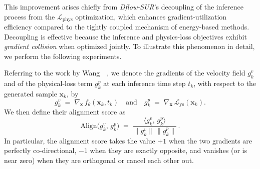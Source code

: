 This improvement arises chiefly from \textit{Dflow-SUR}’s decoupling of the inference process from the $\mathcal{L}_{\mathrm{phys}}$ optimization, which enhances gradient‐utilization efficiency compared to the tightly coupled mechanism of energy-based methods. Decoupling is effective because the inference and physics-loss objectives exhibit \textit{gradient collision} when optimized jointly. To illustrate this phenomenon in detail, we perform the following experiments. 






Referring to the work by Wang~\etal~\cite{aa.Wang2025}, we denote the gradients of the velocity field $g^v_k$ and of the physical‐loss term $g^p_k$ at each inference time step $t_k$, with respect to the generated sample $\mathbf{x}_k$, by
\begin{equation}
    g^v_k \;=\;\nabla_{\mathbf{x}}\,f_\theta(\mathbf{x}_k,t_k)
    \quad\text{and}\quad
    g^p_k \;=\;\nabla_{\mathbf{x}}\,\mathcal{L}_{\mathrm{ ys}}(\mathbf{x}_k). 
\end{equation}
We then define their alignment score as
\begin{equation}
    \mathrm{Align}\bigl(g^v_k,\,g^p_k\bigr)
    \;=\;
    \frac{\bigl\langle g^v_k,\,g^p_k\bigr\rangle}
         {\bigl\lVert g^v_k\bigr\rVert\,\bigl\lVert g^p_k\bigr\rVert}\,.
\end{equation}
In particular, the alignment score takes the value \(+1\) when the two gradients are perfectly co‐directional, \(-1\) when they are exactly opposite, and vanishes (or is near zero) when they are orthogonal or cancel each other out.

